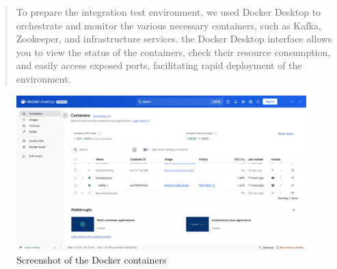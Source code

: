 \documentclass[12pt,a4paper]{report}
\begin{document}
\begin{quote}
To prepare the integration test environment, we used Docker Desktop to
orchestrate and monitor the various necessary containers, such as Kafka,
Zookeeper, and infrastructure services. the Docker Desktop interface
allows you to view the status of the containers, check their resource
consumption, and easily access exposed ports, facilitating rapid
deployment of the environment.
\end{quote}

\begin{figure}[H]
\centering
\includegraphics[width=\textwidth,height=\textheight,keepaspectratio]{media/image66.jpeg}
\caption{Screenshot of the Docker containers}
\label{fig:DC}
\end{figure} 
\end{document}
